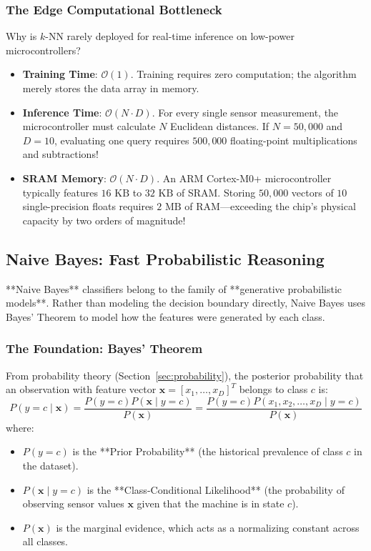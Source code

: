 \subsubsection{The Edge Computational Bottleneck}
Why is $k$-NN rarely deployed for real-time inference on low-power microcontrollers?
\begin{itemize}
    \item \textbf{Training Time}: $\mathcal{O}(1)$. Training requires zero computation; the algorithm merely stores the data array in memory.
    \item \textbf{Inference Time}: $\mathcal{O}(N \cdot D)$. For every single sensor measurement, the microcontroller must calculate $N$ Euclidean distances. If $N = 50{,}000$ and $D = 10$, evaluating one query requires $500{,}000$ floating-point multiplications and subtractions!
    \item \textbf{SRAM Memory}: $\mathcal{O}(N \cdot D)$. An ARM Cortex-M0+ microcontroller typically features $16\text{ KB}$ to $32\text{ KB}$ of SRAM. Storing $50{,}000$ vectors of $10$ single-precision floats requires $2\text{ MB}$ of RAM---exceeding the chip's physical capacity by two orders of magnitude!
\end{itemize}

\subsection{Naive Bayes: Fast Probabilistic Reasoning}\label{subsec:naive_bayes}

**Naive Bayes** classifiers belong to the family of **generative probabilistic models**. Rather than modeling the decision boundary directly, Naive Bayes uses Bayes' Theorem to model how the features were generated by each class.

\subsubsection{The Foundation: Bayes' Theorem}
From probability theory (Section~\ref{sec:probability}), the posterior probability that an observation with feature vector $\mathbf{x} = [x_1, \dots, x_D]^T$ belongs to class $c$ is:
\begin{equation}
P(y = c \mid \mathbf{x}) = \frac{P(y = c) P(\mathbf{x} \mid y = c)}{P(\mathbf{x})} = \frac{P(y = c) P(x_1, x_2, \dots, x_D \mid y = c)}{P(\mathbf{x})}\label{eq:bayes_classification}
\end{equation}
where:
\begin{itemize}
    \item $P(y = c)$ is the **Prior Probability** (the historical prevalence of class $c$ in the dataset).
    \item $P(\mathbf{x} \mid y = c)$ is the **Class-Conditional Likelihood** (the probability of observing sensor values $\mathbf{x}$ given that the machine is in state $c$).
    \item $P(\mathbf{x})$ is the marginal evidence, which acts as a normalizing constant across all classes.
\end{itemize}

